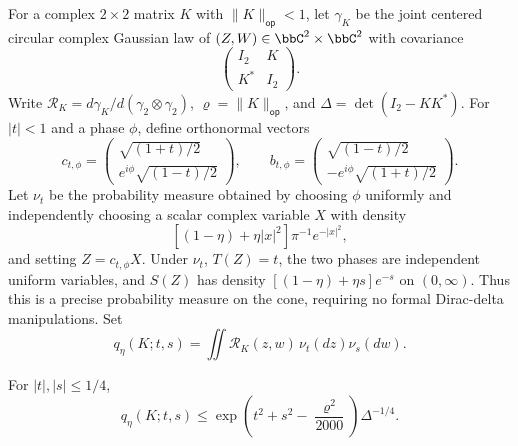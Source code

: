 \documentclass[11pt,reqno]{amsart}
\begin{document}
For a complex $2\times2$ matrix $K$ with $\|K\|_{\mathsf{op}}<1$, let $\gamma_K$ be the joint centered circular complex Gaussian law of $(Z,W)\in\bbC^2\times\bbC^2$ with covariance
\[
 \begin{pmatrix}I_2&K\\K^*&I_2\end{pmatrix}.
\]
Write $\mathcal R_K=d\gamma_K/d(\gamma_2\otimes\gamma_2)$, $\varrho=\|K\|_{\mathsf{op}}$, and $\Delta=\det(I_2-KK^*)$.
For $|t|<1$ and a phase $\phi$, define orthonormal vectors
\[
 c_{t,\phi}=\begin{pmatrix}\sqrt{(1+t)/2}\\ e^{i\phi}\sqrt{(1-t)/2}\end{pmatrix},\qquad
 b_{t,\phi}=\begin{pmatrix}\sqrt{(1-t)/2}\\-e^{i\phi}\sqrt{(1+t)/2}\end{pmatrix}.
\]
Let $\nu_t$ be the probability measure obtained by choosing $\phi$ uniformly and independently choosing a scalar complex variable $X$ with density
\[
 [(1-\eta)+\eta|x|^2]\pi^{-1}e^{-|x|^2},
\]
and setting $Z=c_{t,\phi}X$. Under $\nu_t$, $T(Z)=t$, the two phases are independent uniform variables, and $S(Z)$ has density $[(1-\eta)+\eta s]e^{-s}$ on $(0,\infty)$. Thus this is a precise probability measure on the cone, requiring no formal Dirac-delta manipulations. Set
\[
 q_\eta(K;t,s)=\iint\mathcal R_K(z,w)\,\nu_t(dz)\nu_s(dw).
\]

\begin{lem}\label{lem:cone}
For $|t|,|s|\le1/4$,
\begin{equation}\label{eq:cone-bound}
 q_\eta(K;t,s)\le
 \exp\left(t^2+s^2-\frac{\varrho^2}{2000}\right)\Delta^{-1/4}.
\end{equation}
\end{lem}
\end{document}
